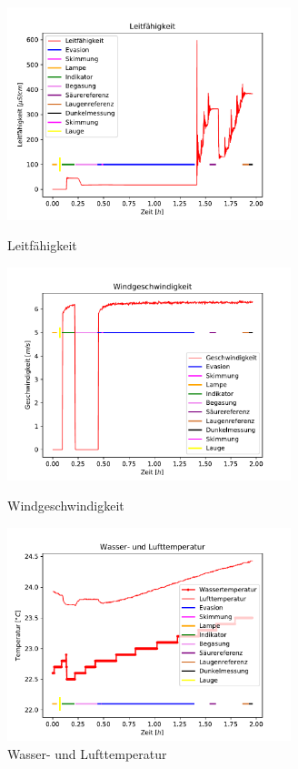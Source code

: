 \documentclass[12pt]{article}
\begin{document}
\begin{figure}[H]
	\centering
	\parbox{82.5mm}{
		\centering
		\includegraphics[width=82.5mm]{Meerwasser/Leitfaehigkeit}
		\caption{Leitf\"ahigkeit}
	}
	\hfill%
	\parbox{82.5mm}{
		\centering
		\includegraphics[width=82.5mm]{Meerwasser/Windgeschwindigkeit}
		\caption{Windgeschwindigkeit}
	}
	\centering
	\parbox{82.5mm}{
		\centering
		\includegraphics[width=82.5mm]{Meerwasser/Wassertemperatur}
		\caption{Wasser- und Lufttemperatur}
	}
	\hfill%
	\parbox{82.5mm}{
		\centering
}
\end{figure}
\end{document}
